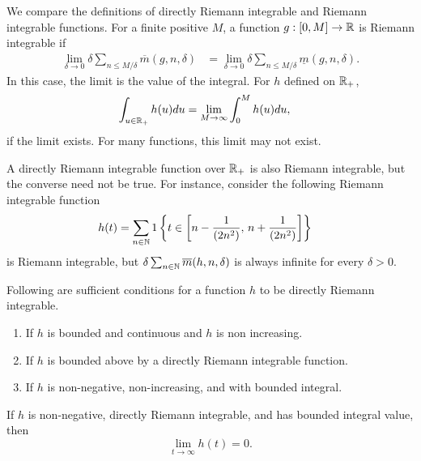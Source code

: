 \documentclass[a4paper,10pt,english]{article}
\begin{document}
\begin{shaded*}
We compare the definitions of directly Riemann integrable and Riemann integrable functions. 
For a finite positive $M$, a function $g: [0, M] \rightarrow \mathbb{R} $ is Riemann integrable if 
\begin{align*}
\lim_{\delta \to 0} \delta \sum_{n \leq M/\delta}\overline{m}(g,n,\delta) &=\lim_{\delta \to 0} \delta \sum_{n \leq M/\delta}\underline{m}(g,n,\delta). 
\end{align*} 
In this case, the limit is the value of the integral. 
For $h$ defined on $\mathbb{R}_+$, 
\begin{align*}
\int_{u \in \mathbb{R}_+}h(u)du &= \lim_{M \rightarrow \infty}\int_{0}^{M}h(u)du, 
\end{align*}
if the limit exists. For many functions, this limit may not exist.

A directly Riemann integrable function over $\mathbb{R}_+$ is also Riemann integrable, but the converse need not be true. 
For instance, consider the following Riemann integrable function
\begin{align*}
h(t) &= \sum_{n\in\mathbb{N}}1\left\{t \in \left[n-\frac{1}{(2n^2)},\,n+\frac{1}{(2n^2)}\right]\right\}
\end{align*} is Riemann integrable, but $\delta \sum_{n \in \mathbb{N}}\overline{m}(h,n,\delta)$ is always infinite for every $\delta>0.$
\end{shaded*}
\begin{prop}%
Following are sufficient conditions for a function $h$ to be directly Riemann integrable.
  \begin{enumerate}
  \item If $h$ is bounded and continuous and $h$ is non increasing. 
  \item If $h$ is bounded above by a directly Riemann integrable function.
	\item If $h$ is non-negative, non-increasing, and with bounded integral.
  \end{enumerate}
\end{prop}
\begin{prop} If $h$ is non-negative, directly Riemann integrable, and has bounded integral value, then 
\begin{equation*}
\lim_{t \rightarrow \infty} h(t)=0.
\end{equation*}
\end{prop}
\end{document}
